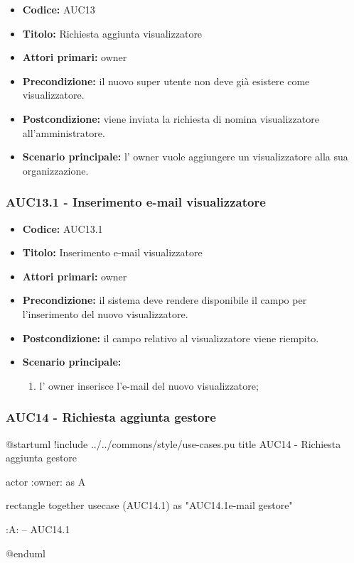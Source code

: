 \documentclass[casi-duso]{subfiles}
\begin{document}
\begin{itemize}
  \item \textbf{Codice:} AUC13
  \item \textbf{Titolo:} Richiesta aggiunta visualizzatore
  \item \textbf{Attori primari:} owner
  \item \textbf{Precondizione:} il nuovo super utente non deve già esistere come visualizzatore.
  \item \textbf{Postcondizione:} viene inviata la richiesta di nomina visualizzatore all'amministratore.
  \item \textbf{Scenario principale:} l' owner vuole aggiungere un visualizzatore alla sua organizzazione.
\end{itemize}

\subsubsection{AUC13.1 - Inserimento e-mail visualizzatore}%
\label{subsub:AUC13.1}
\begin{itemize}
  \item \textbf{Codice:} AUC13.1
  \item \textbf{Titolo:} Inserimento e-mail visualizzatore
  \item \textbf{Attori primari:} owner
  \item \textbf{Precondizione:} il sistema deve rendere disponibile il campo per l'inserimento del nuovo visualizzatore.
  \item \textbf{Postcondizione:} il campo relativo al visualizzatore viene riempito.
  \item \textbf{Scenario principale:} 
  \begin{enumerate}
    \item l' owner inserisce l'e-mail del nuovo visualizzatore;
  \end{enumerate}
\end{itemize}

\subsubsection{AUC14 - Richiesta aggiunta gestore}%
\label{subsub:AUC14}

\begin{plantuml}
@startuml
!include ../../commons/style/use-cases.pu
title AUC14 - Richiesta aggiunta gestore

actor :owner: as A

rectangle {
  together {
    usecase (AUC14.1) as "AUC14.1\nInserimento e-mail gestore"
  }
}

:A: -- AUC14.1

@enduml
\end{plantuml}
\end{document}
